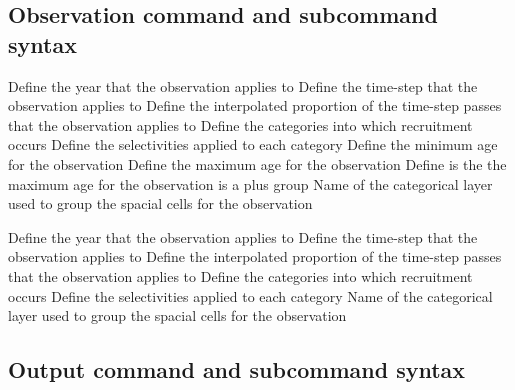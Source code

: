\subsection{Observation command and subcommand syntax}
\par
{} {Define the year that the observation applies to}
 {Define the time-step that the observation applies to}
 {Define the interpolated proportion of the time-step passes that the observation applies to}
 {Define the categories into which recruitment occurs}
 {Define the selectivities applied to each category}
 {Define the minimum age for the observation}
 {Define the maximum age for the observation}
 {Define is the the maximum age for the observation is a plus group}
 {Name of the categorical layer used to group the spacial cells for the observation}
\par {}\par
{} {Define the year that the observation applies to}
 {Define the time-step that the observation applies to}
 {Define the interpolated proportion of the time-step passes that the observation applies to}
 {Define the categories into which recruitment occurs}
 {Define the selectivities applied to each category}
 {Name of the categorical layer used to group the spacial cells for the observation}
\subsection{Output command and subcommand syntax}
